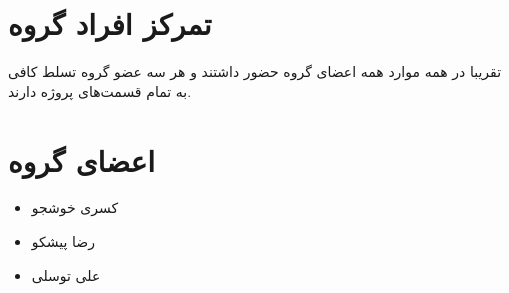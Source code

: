 \documentclass{article}
\begin{document}
\section{تمرکز افراد گروه}
تقریبا در همه موارد همه اعضای گروه حضور داشتند و هر سه عضو گروه تسلط کافی به تمام قسمت‌های پروژه دارند.

\section{اعضای گروه}
\begin{itemize}
    \item کسری خوشجو
    \item رضا پیشکو
    \item علی توسلی
\end{itemize}
\end{document}

